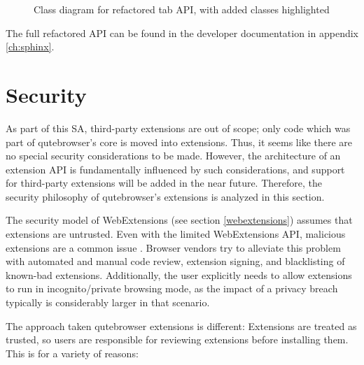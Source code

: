 \documentclass[a4paper,parskip=full,DIV=14,BCOR=15mm]{scrreprt}
\newcommand{\mycomposition}[4]
{
\draw[umlcd style, fill=\umldrawcolor, diamond-] (#1) -- (#4)
node[near end, above]{#2}
node[near end, below]{#3};
}
\begin{document}
\begin{figure}[h]
\caption[Class diagram for refactored tab API]{Class diagram for refactored tab
  API, with added classes highlighted}
\end{figure}

The full refactored API can be found in the developer documentation in appendix
\ref{ch:sphinx}.

\section{Security}
\label{security}
As part of this SA, third-party extensions are out of scope; only code which was
part of qutebrowser's core is moved into extensions. Thus, it seems like there
are no special security considerations to be made. However, the architecture of
an extension API is fundamentally influenced by such considerations, and support
for third-party extensions will be added in the near future. Therefore, the
security philosophy of qutebrowser's extensions is analyzed in this section.

The security model of WebExtensions (see section \ref{webextensions}) assumes
that extensions are untrusted. Even with the limited WebExtensions API,
malicious extensions are a common issue
\autocite{mozilla-signing,mozilla-trustworthy}. Browser vendors try to alleviate
this problem with automated and manual code review, extension signing, and
blacklisting of known-bad extensions. Additionally, the user explicitly needs to
allow extensions to run in incognito/private browsing mode, as the impact of a
privacy breach typically is considerably larger in that scenario.

The approach taken qutebrowser extensions is different: Extensions are treated
as trusted, so users are responsible for reviewing extensions before installing
them. This is for a variety of reasons:
\end{document}
